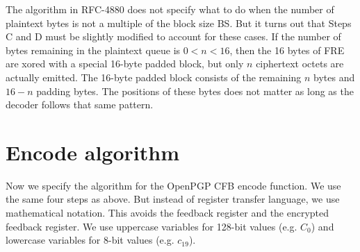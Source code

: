 \documentclass{article}
\begin{document}
The algorithm in RFC-4880 does not specify what to do when 
the number of plaintext bytes is not a multiple of the block size BS.
But it turns out that Steps C and D must be slightly modified to account for these cases.
If the number of bytes remaining in the plaintext queue is $0 < n < 16$,
then the 16 bytes of FRE are xored with a special 16-byte padded block,
but only $n$ ciphertext octets are actually emitted.
The 16-byte padded block consists of the remaining $n$ bytes and $16-n$ padding bytes.
The positions of these bytes does not matter as long as the decoder follows that same pattern.


\section*{Encode algorithm}

Now we specify the algorithm for the OpenPGP CFB encode function.
We use the same four steps as above.
But instead of register transfer language, we use mathematical notation.
This avoids the feedback register and the encrypted feedback register.
We use uppercase variables for 128-bit values (e.g. $C_0$)
and lowercase variables for 8-bit values (e.g. $c_{19}$).
\end{document}
